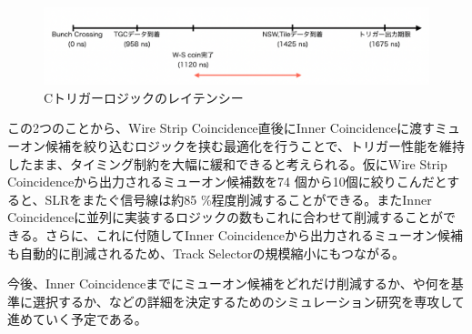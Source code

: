 \begin{figure} 
\centering
\includegraphics[width=16cm]{fig/SL/Trigger_latency_memo.png}
\caption[トリガーロジックのレイテンシー]{Cトリガーロジックのレイテンシー}
\label{Trigger_latency_memo}
\end{figure}

この2つのことから、Wire Strip Coincidence直後にInner Coincidenceに渡すミューオン候補を絞り込むロジックを挟む最適化を行うことで、トリガー性能を維持したまま、タイミング制約を大幅に緩和できると考えられる。仮にWire Strip Coincidenceから出力されるミューオン候補数を74 個から10個に絞りこんだとすると、SLRをまたぐ信号線は約85 \%程度削減することができる。またInner Coincidenceに並列に実装するロジックの数もこれに合わせて削減することができる。さらに、これに付随してInner Coincidenceから出力されるミューオン候補も自動的に削減されるため、Track Selectorの規模縮小にもつながる。

今後、Inner Coincidenceまでにミューオン候補をどれだけ削減するか、や何を基準に選択するか、などの詳細を決定するためのシミュレーション研究を専攻して進めていく予定である。